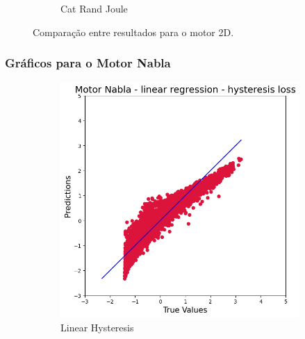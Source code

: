 \documentclass{article}
\begin{document}
\begin{figure}[!htbp]
\begin{subfigure}[b]{0.23\textwidth}
        \caption{Cat Rand Joule}
    \end{subfigure}
    \hfill
    \begin{subfigure}[b]{0.23\textwidth}
        \centering
        \null
    \end{subfigure}
    
    \caption{Comparação entre resultados para o motor 2D.}
\end{figure}



\newpage

\subsubsection{Gráficos para o Motor Nabla}

\begin{figure}[!htbp]
    \centering
    \begin{subfigure}[b]{0.23\textwidth}
        \centering
        \includegraphics[width=\textwidth]{images/Nabla/linear_hysteresis.png}
        \caption{Linear Hysteresis}
    \end{subfigure}
    \hfill
    \begin{subfigure}[b]{0.23\textwidth}
        \centering

\end{subfigure}
\end{figure}
\end{document}
